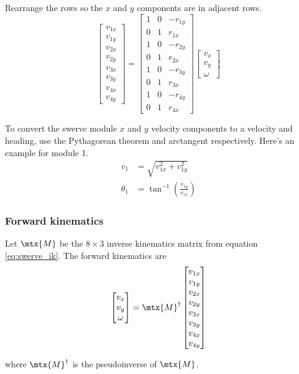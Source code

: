 Rearrange the rows so the $x$ and $y$ components are in adjacent rows.
\begin{equation}
  \label{eq:swerve_ik}
  \begin{bmatrix}
    v_{1x} \\
    v_{1y} \\
    v_{2x} \\
    v_{2y} \\
    v_{3x} \\
    v_{3y} \\
    v_{4x} \\
    v_{4y}
  \end{bmatrix} =
  \begin{bmatrix}
    1 & 0 & -r_{1y} \\
    0 & 1 &  r_{1x} \\
    1 & 0 & -r_{2y} \\
    0 & 1 &  r_{2x} \\
    1 & 0 & -r_{3y} \\
    0 & 1 &  r_{3x} \\
    1 & 0 & -r_{4y} \\
    0 & 1 &  r_{4x}
  \end{bmatrix}
  \begin{bmatrix}
    v_x \\
    v_y \\
    \omega
  \end{bmatrix}
\end{equation}

To convert the swerve module $x$ and $y$ velocity components to a velocity and
heading, use the Pythagorean theorem and arctangent respectively. Here's an
example for module 1.
\begin{align}
  v_1 &= \sqrt{v_{1x}^2 + v_{1y}^2} \\
  \theta_1 &= \tan^{-1}\left(\frac{v_{1y}}{v_{1x}}\right)
\end{align}

\subsubsection{Forward kinematics}

Let $\mtx{M}$ be the $8 \times 3$ inverse kinematics matrix from equation
\eqref{eq:swerve_ik}. The forward kinematics are
\begin{equation}
  \begin{bmatrix}
    v_x \\
    v_y \\
    \omega
  \end{bmatrix} =
  \mtx{M}^\dagger
  \begin{bmatrix}
    v_{1x} \\
    v_{1y} \\
    v_{2x} \\
    v_{2y} \\
    v_{3x} \\
    v_{3y} \\
    v_{4x} \\
    v_{4y}
  \end{bmatrix}
\end{equation}

where $\mtx{M}^\dagger$ is the pseudoinverse of $\mtx{M}$.

